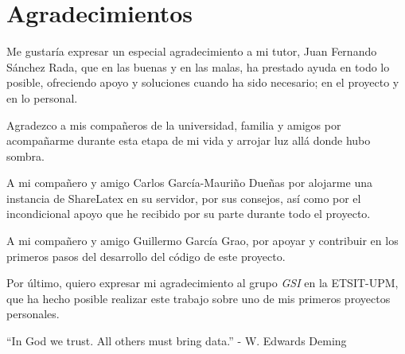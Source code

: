 \cleardoublepage
{}
\chapter*{Agradecimientos}

Me gustaría expresar un especial agradecimiento a mi tutor, Juan Fernando Sánchez Rada, que en las buenas y en las malas, ha prestado ayuda en todo lo posible, ofreciendo apoyo y soluciones cuando ha sido necesario; en el proyecto y en lo personal.

Agradezco a mis compañeros de la universidad, familia y amigos por acompañarme durante esta etapa de mi vida y arrojar luz allá donde hubo sombra.

A mi compañero y amigo Carlos García-Mauriño Dueñas por alojarme una instancia de ShareLatex en su servidor, por sus consejos, así como por el incondicional apoyo que he recibido por su parte durante todo el proyecto.

A mi compañero y amigo Guillermo García Grao, por apoyar y contribuir en los primeros pasos del desarrollo del código de este proyecto.

Por último, quiero expresar mi agradecimiento al grupo {\sl GSI} en la ETSIT-UPM, que ha hecho posible realizar este trabajo sobre uno de mis primeros proyectos personales.

\begin{flushright}
	``In God we trust. All others must bring data.'' - W. Edwards Deming
\end{flushright}